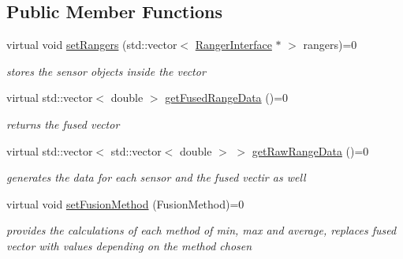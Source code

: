 \subsection*{Public Member Functions}
\begin{DoxyCompactItemize}
\item 
virtual void \hyperlink{classRangerFusionInterface_aea3d7cf254c0553e624306ca06d86120}{set\+Rangers} (std\+::vector$<$ \hyperlink{classRangerInterface}{Ranger\+Interface} $\ast$ $>$ rangers)=0\hypertarget{classRangerFusionInterface_aea3d7cf254c0553e624306ca06d86120}{}\label{classRangerFusionInterface_aea3d7cf254c0553e624306ca06d86120}

\begin{DoxyCompactList}\small\item\em stores the sensor objects inside the vector \end{DoxyCompactList}\item 
virtual std\+::vector$<$ double $>$ \hyperlink{classRangerFusionInterface_a92a67e0f8f17d7bf0059002dcbeb5da8}{get\+Fused\+Range\+Data} ()=0\hypertarget{classRangerFusionInterface_a92a67e0f8f17d7bf0059002dcbeb5da8}{}\label{classRangerFusionInterface_a92a67e0f8f17d7bf0059002dcbeb5da8}

\begin{DoxyCompactList}\small\item\em returns the fused vector \end{DoxyCompactList}\item 
virtual std\+::vector$<$ std\+::vector$<$ double $>$ $>$ \hyperlink{classRangerFusionInterface_a9d60ca5866261026b870d7c0171587f5}{get\+Raw\+Range\+Data} ()=0\hypertarget{classRangerFusionInterface_a9d60ca5866261026b870d7c0171587f5}{}\label{classRangerFusionInterface_a9d60ca5866261026b870d7c0171587f5}

\begin{DoxyCompactList}\small\item\em generates the data for each sensor and the fused vectir as well \end{DoxyCompactList}\item 
virtual void \hyperlink{classRangerFusionInterface_a5eb055bfcf3ac38dd82cde5d0661e11e}{set\+Fusion\+Method} (Fusion\+Method)=0\hypertarget{classRangerFusionInterface_a5eb055bfcf3ac38dd82cde5d0661e11e}{}\label{classRangerFusionInterface_a5eb055bfcf3ac38dd82cde5d0661e11e}

\begin{DoxyCompactList}\small\item\em provides the calculations of each method of min, max and average, replaces fused vector with values depending on the method chosen \end{DoxyCompactList}\end{DoxyCompactItemize}


